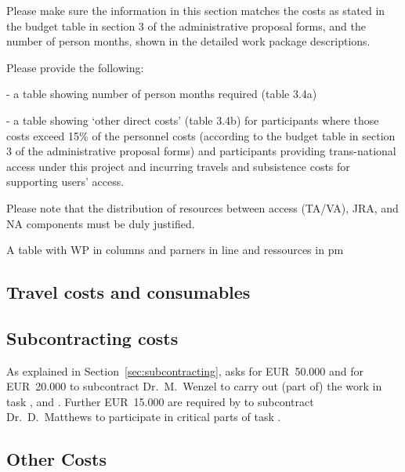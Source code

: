 \begin{todo}{}\color{red}
Please make sure the information in this section matches the costs as stated in the budget table in section 3 of the administrative proposal forms, and the number of person months, shown in the detailed work package descriptions.

Please provide the following:

- a table showing number of person months required (table 3.4a)

- a table showing ‘other direct costs’ (table 3.4b) for participants where those  costs exceed 15\% of the personnel costs (according to the budget  table in section 3 of the administrative proposal forms) and participants providing trans-national access under this project and incurring travels and subsistence costs for supporting users' access.

Please note that the distribution of resources between access (TA/VA), JRA, and NA components must be duly justified.
\end{todo}

{\color{red} A table with WP in columns and parners in line and
  ressources in pm}

\subsection{Travel costs and consumables}\label{sec:travel-costs}

\subsection{Subcontracting costs}\label{sec:subcontracting-costs}

As explained in Section~\ref{sec:subcontracting},  asks for
EUR~50.000 and  for EUR~20.000 to subcontract Dr.\ M.\ Wenzel to
carry out (part of) the work in task
,  and
. Further EUR~15.000 are required
by  to subcontract Dr.\ D.\ Matthews to participate in
critical parts of task .

\subsection{Other Costs}


